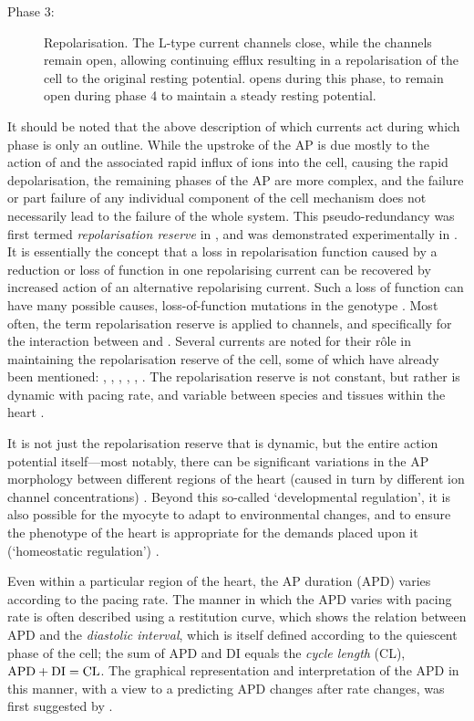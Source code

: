 \documentclass[../thesis-main.tex]{subfiles}
\begin{document}
\begin{description}
 \item[Phase 3:] Repolarisation. The L-type \ca{} current channels close, while the \iks{} channels remain open, allowing continuing \K{} efflux resulting in a repolarisation of the cell to the original resting potential. \ikix{} opens during this phase, to remain open during phase 4 to maintain a steady resting potential. 
\end{description}
It should be noted that the above description of which currents act during which phase is only an outline. While the upstroke of the AP is due mostly to the action of \ina{} and the associated rapid influx of \na{} ions into the cell, causing the rapid depolarisation, the remaining phases of the AP are more complex, and the failure or part failure of any individual component of the cell mechanism does not necessarily lead to the failure of the whole system. This pseudo-redundancy was first termed \emph{repolarisation reserve} in \citet{Roden1998}, and was demonstrated experimentally in \citet{Varro2000}. It is essentially the concept that a loss in repolarisation function caused by a reduction or loss of function in one repolarising current can be recovered by increased action of an alternative repolarising current. Such a loss of function can have many possible causes, \eg{} loss-of-function mutations in the genotype \citep{Rosati2004}. Most often, the term repolarisation reserve is applied to \K{} channels, and specifically for the interaction between \ikr{} and \iks{} \citep{Xiao2008}. Several currents are noted for their r\^ole in maintaining the repolarisation reserve of the cell, some of which have already been mentioned: \ikr{}, \iks{}, \ikix{}, \ito{}, \ica{}, \ina{} \citep{Varro2011}. The repolarisation reserve is not constant, but rather is dynamic with pacing rate, and variable between species and tissues within the heart \citep{Carmeliet2006}.

It is not just the repolarisation reserve that is dynamic, but the entire action potential itself---most notably, there can be significant variations in the AP morphology between different regions of the heart (caused in turn by different ion channel concentrations) \citep{Giles1988}. Beyond this so-called `developmental regulation', it is also possible for the myocyte to adapt to environmental changes, and to ensure the phenotype of the heart is appropriate for the demands placed upon it (`homeostatic regulation') \citep{Rosati2004}.

Even within a particular region of the heart, the AP duration (APD) varies according to the pacing rate. The manner in which the APD varies with pacing rate is often described using a restitution curve, which shows the relation between APD and the \emph{diastolic interval}, which is itself defined according to the quiescent phase of the cell; the sum of APD and DI equals the \emph{cycle length} (CL), \idest{} $\textnormal{APD}+\textnormal{DI}=\textnormal{CL}$. The graphical representation and interpretation of the APD in this manner, with a view to a predicting APD changes after rate changes, was first suggested by \citet{Nolasco1968}.
\end{document}
